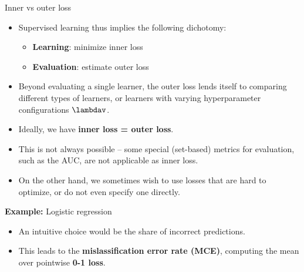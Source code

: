 \documentclass[11pt,compress,t,notes=noshow, xcolor=table]{beamer}
\begin{document}
\begin{vbframe}{Inner vs outer loss}

\begin{itemize}
  \item Supervised learning thus implies the following dichotomy:
  \begin{itemize}
    \item \textbf{Learning}: minimize inner loss
    \item \textbf{Evaluation}: estimate outer loss
  \end{itemize}
  \item Beyond evaluating a single learner, the outer loss lends itself to
  comparing different types of learners, or learners with varying hyperparameter
  configurations $\lambdav$.
  \item Ideally, we have \textbf{inner loss = outer loss}.
  \item This is not always possible -- some special (set-based) metrics for 
  evaluation, such as the AUC, are not applicable as inner loss.
  \item On the other hand, we sometimes wish to use losses that are 
  hard to optimize, or do not even specify one directly.
\end{itemize}

\framebreak

\textbf{Example:} Logistic regression

\begin{itemize}
  \item An intuitive choice would be the share of incorrect predictions.
  \item This leads to the \textbf{mislassification error rate (MCE)}, computing
  the mean over pointwise \textbf{0-1 loss}.
\end{itemize}

\lz


\end{vbframe}
\end{document}
